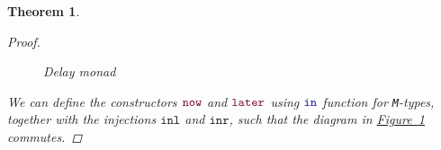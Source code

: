 \documentclass[twoside,11pt,openright]{report}
\theoremstyle{plain} %
\newtheorem{thm}{Theorem}[section]
\theoremstyle{definition}
\theoremstyle{remark}
\newcommand*{\figref}[1]{\hyperref[fig:#1]{Figure~\ref*{fig:#1}}}
\newcommand*{\type}[1]{\textcolor{magenta!90!black}{#1}}
\newcommand*{\function}[1]{\textcolor{blue!60!black}{\ensuremath{\mathtt{#1}}}}
\newcommand*{\constructor}[1]{\textcolor{purple!60!black}{\ensuremath{\mathtt{#1}}}}
\newcommand*{\typeformer}[1]{\ensuremath{\mathtt{#1}}}
\begin{document}
\begin{thm}
\begin{proof}
    \begin{figure}[h]
      \centering
      \caption{Delay monad}
      \label{fig:delay-monad}
    \end{figure}
    \noindent We can define the constructors \(\constructor{now}\) and \(\constructor{later}\) using \(\function{in}\) function for \texttt{M}-types, together with the injections \(\mathtt{inl}\) and \(\mathtt{inr}\), such that the diagram in \figref{delay-monad} commutes.
  \end{proof}
\end{thm}
\end{document}
